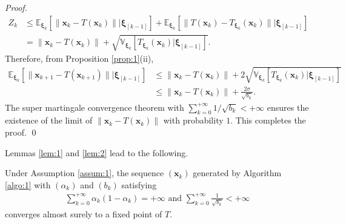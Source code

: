 \documentclass[smallextended,referee,envcountsect,]{svjour3}
\begin{document}
\begin{proof}
\begin{align*}
Z_k 
&\leq
\mathbb{E}_{\bm{\xi}_k} \left[ \| \bm{x}_{k} - T (\bm{x}_{k}) \| \big| \bm{\xi}_{[k-1]} \right]
+
\mathbb{E}_{\bm{\xi}_k} \left[ \| T (\bm{x}_{k}) - T_{\bm{\xi}_k} (\bm{x}_{k}) \| \big| \bm{\xi}_{[k-1]} \right]\\
&=
\| \bm{x}_{k} - T (\bm{x}_{k}) \|
+ 
\sqrt{\mathbb{V}_{\bm{\xi}_k} \left[ T_{\bm{\xi}_k} (\bm{x}_{k}) \big| \bm{\xi}_{[k-1]} \right]}. 
\end{align*}
Therefore, from Proposition \ref{prop:1}(ii), 
\begin{align*}
\mathbb{E}_{\bm{\xi}_k} \left[ \| \bm{x}_{k+1} - T (\bm{x}_{k+1}) \| \big| \bm{\xi}_{[k-1]} \right]
&\leq
\| \bm{x}_{k} - T (\bm{x}_{k}) \|
+ 
2 \sqrt{\mathbb{V}_{\bm{\xi}_k} \left[ T_{\bm{\xi}_k} (\bm{x}_{k}) \big| \bm{\xi}_{[k-1]} \right]}\\
&\leq
\| \bm{x}_{k} - T (\bm{x}_{k}) \|
+ 
\frac{2 \sigma}{\sqrt{b_k}}. 
\end{align*}
The super martingale convergence theorem \cite[Proposition 8.2.10]{bert} with $\sum_{k=0}^{+ \infty} 1/\sqrt{b_k} < + \infty$ ensures the existence of the limit of $\|\bm{x}_k - T (\bm{x}_k) \|$ with probability $1$. This completes the proof.
\qed
\end{proof}

Lemmas \ref{lem:1} and \ref{lem:2} lead to the following.

\begin{theorem}\label{thm:1}
Under Assumption \ref{assum:1}, the sequence $(\bm{x}_k)$ generated by Algorithm \ref{algo:1} with $(\alpha_k)$ and $(b_k)$ satisfying 
\begin{align}\label{condition_1}
\sum_{k=0}^{+\infty} \alpha_k (1 - \alpha_k) = + \infty \text{ and }
\sum_{k=0}^{+ \infty} \frac{1}{\sqrt{b_k}} < + \infty
\end{align}
converges almost surely to a fixed point of $T$.
\end{theorem}
\end{document}
